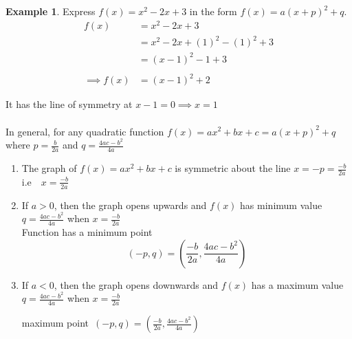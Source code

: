 \documentclass[11pt,a4paper]{article}
\theoremstyle{definition}
\newtheorem{example}[thm]{Example}
\begin{document}
\begin{example}

Express $f(x)=x^2-2x+3$ in the form $f(x)=a(x+p)^2+q$.
\begin{align*}
f(x) & = x^2-2x+3\\
     & = x^2-2x+(1)^2-(1)^2+3\\
     & = (x-1)^2-1+3\\\\
\implies f(x) & = (x-1)^2+2
\end{align*}

It has the line of symmetry at $x-1=0\implies x=1$\\\\

In general, for any quadratic function $f(x)=ax^2+bx+c=a(x+p)^2+q$ where $p=\frac{b}{2a}$ and $q=\frac{4ac-b^2}{4a}$
\begin{enumerate}
\item The graph of $f(x)=ax^2+bx+c$ is symmetric about the line $x=-p=\frac{-b}{2a}$\,
$\text{i.e}\quad  x=\frac{-b}{2a}$
\item If $a>0$, then the graph opens upwards and $f(x)$ has minimum value $q=\frac{4ac-b^2}{4a}$ when $x=\frac{-b}{2a}$\\

Function has a minimum point $$(-p,q)=\left(\frac{-b}{2a},\frac{4ac-b^2}{4a}\right)$$

\begin{figure}[H]
\centering
{}
\end{figure}


\item If $a<0$, then the graph opens downwards and $f(x)$ has a maximum value\\ $q=\frac{4ac-b^2}{4a}$ when $x=\frac{-b}{2a}$


\begin{figure}[H]
\centering
{}
\end{figure}

maximum point \,$(-p,q)=\left(\frac{-b}{2a},\frac{4ac-b^2}{4a}\right)$\\\\
\end{enumerate}
\end{example}
\end{document}
